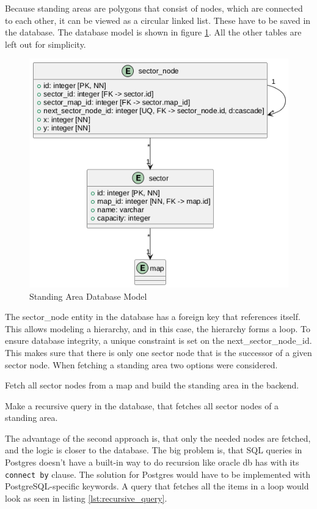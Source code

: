 Because standing areas are polygons that consist of nodes, which are connected to each other, it can be viewed as a circular linked list. These have to be saved in the database. The database model is shown in figure \ref{fig:standing_area_db_model}. All the other tables are left out for simplicity.

\begin{figure}
    \centering
    \includegraphics[scale=0.5]{pics/standing-area-db.png}
    \caption{Standing Area Database Model}
    \label{fig:standing_area_db_model}
\end{figure}

The sector\_node entity in the database has a foreign key that references itself. This allows modeling a hierarchy, and in this case, the hierarchy forms a loop. To ensure database integrity, a unique constraint is set on the next\_sector\_node\_id. This makes sure that there is only one sector node that is the successor of a given sector node. When fetching a standing area two options were considered.

\begin{compactenum}
\item Fetch all sector nodes from a map and build the standing area in the backend.
\item Make a recursive query in the database, that fetches all sector nodes of a standing area.
\end{compactenum}

The advantage of the second approach is, that only the needed nodes are fetched, and the logic is closer to the database. The big problem is, that SQL queries in Postgres doesn't have  a built-in way to do recursion like oracle db has with its \texttt{connect by} clause. The solution for Postgres would have to be implemented with PostgreSQL-specific keywords. A query that fetches all the items in a loop would look as seen in listing \ref{lst:recursive_query}. 

